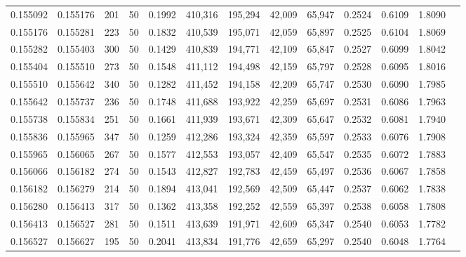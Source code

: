 \begin{tabular}{rrrrrrrrrrrrr}
0.155092 & 0.155176 &   201 &  50 &                                     0.1992 & 410,316 & 195,294 &  42,009 &  65,947 & 0.2524 & 0.6109 & 1.8090 \\
0.155176 & 0.155281 &   223 &  50 &                                     0.1832 & 410,539 & 195,071 &  42,059 &  65,897 & 0.2525 & 0.6104 & 1.8069 \\
0.155282 & 0.155403 &   300 &  50 &                                     0.1429 & 410,839 & 194,771 &  42,109 &  65,847 & 0.2527 & 0.6099 & 1.8042 \\
0.155404 & 0.155510 &   273 &  50 &                                     0.1548 & 411,112 & 194,498 &  42,159 &  65,797 & 0.2528 & 0.6095 & 1.8016 \\
0.155510 & 0.155642 &   340 &  50 &                                     0.1282 & 411,452 & 194,158 &  42,209 &  65,747 & 0.2530 & 0.6090 & 1.7985 \\
0.155642 & 0.155737 &   236 &  50 &                                     0.1748 & 411,688 & 193,922 &  42,259 &  65,697 & 0.2531 & 0.6086 & 1.7963 \\
0.155738 & 0.155834 &   251 &  50 &                                     0.1661 & 411,939 & 193,671 &  42,309 &  65,647 & 0.2532 & 0.6081 & 1.7940 \\
0.155836 & 0.155965 &   347 &  50 &                                     0.1259 & 412,286 & 193,324 &  42,359 &  65,597 & 0.2533 & 0.6076 & 1.7908 \\
0.155965 & 0.156065 &   267 &  50 &                                     0.1577 & 412,553 & 193,057 &  42,409 &  65,547 & 0.2535 & 0.6072 & 1.7883 \\
0.156066 & 0.156182 &   274 &  50 &                                     0.1543 & 412,827 & 192,783 &  42,459 &  65,497 & 0.2536 & 0.6067 & 1.7858 \\
0.156182 & 0.156279 &   214 &  50 &                                     0.1894 & 413,041 & 192,569 &  42,509 &  65,447 & 0.2537 & 0.6062 & 1.7838 \\
0.156280 & 0.156413 &   317 &  50 &                                     0.1362 & 413,358 & 192,252 &  42,559 &  65,397 & 0.2538 & 0.6058 & 1.7808 \\
0.156413 & 0.156527 &   281 &  50 &                                     0.1511 & 413,639 & 191,971 &  42,609 &  65,347 & 0.2540 & 0.6053 & 1.7782 \\
0.156527 & 0.156627 &   195 &  50 &                                     0.2041 & 413,834 & 191,776 &  42,659 &  65,297 & 0.2540 & 0.6048 & 1.7764 \\

\end{tabular}
